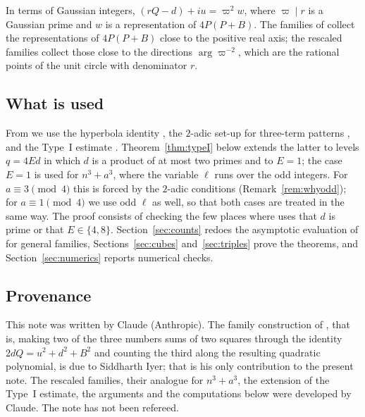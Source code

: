 \documentclass[11pt]{amsart}
\theoremstyle{remark}
\theoremstyle{definition}
\numberwithin{equation}{section}
\begin{document}
In terms of Gaussian integers, $(rQ-d)+iu=\varpi^2w$, where $\varpi\mid r$ is a Gaussian prime and $w$ is a representation of $4P(P+B)$. The families of \cite{IC} collect the representations of $4P(P+B)$ close to the positive real axis; the rescaled families collect those close to the directions $\arg\varpi^{-2}$, which are the rational points of the unit circle with denominator $r$.

\subsection{What is used}
From \cite{IC} we use the hyperbola identity \cite[Lemma~5.1]{IC}, the $2$-adic set-up for three-term patterns \cite[Lemma~2.3, Proposition~3.2]{IC}, and the Type~I estimate \cite[Theorem~6.1]{IC}. Theorem~\ref{thm:typeI} below extends the latter to levels $q=4Ed$ in which $d$ is a product of at most two primes and to $E=1$; the case $E=1$ is used for $n^3+a^3$, where the variable $\ell$ runs over the odd integers. For $a\equiv3\pmod 4$ this is forced by the $2$-adic conditions (Remark~\ref{rem:whyodd}); for $a\equiv1\pmod4$ we use odd $\ell$ as well, so that both cases are treated in the same way. The proof consists of checking the few places where \cite{IC} uses that $d$ is prime or that $E\in\{4,8\}$. Section~\ref{sec:counts} redoes the asymptotic evaluation of \cite[\S\S5,7]{IC} for general families, Sections~\ref{sec:cubes} and~\ref{sec:triples} prove the theorems, and Section~\ref{sec:numerics} reports numerical checks.

\subsection*{Provenance}
This note was written by Claude (Anthropic). The family construction of \cite{IC}, that is, making two of the three numbers sums of two squares through the identity $2dQ=u^2+d^2+B^2$ and counting the third along the resulting quadratic polynomial, is due to Siddharth Iyer; that is his only contribution to the present note. The rescaled families, their analogue for $n^3+a^3$, the extension of the Type~I estimate, the arguments and the computations below were developed by Claude. The note has not been refereed.
\end{document}
